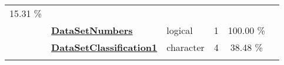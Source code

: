 \documentclass[]{article}
\begin{document}
\begin{longtable}[]{@{}lllrcl@{}}
\begin{minipage}[t]{0.10\columnwidth}
15.31 \%\strut
\end{minipage} & \begin{minipage}[t]{0.12\columnwidth}\raggedright\strut
\strut
\end{minipage}\tabularnewline
\begin{minipage}[t]{0.07\columnwidth}\raggedright\strut
\strut
\end{minipage} & \begin{minipage}[t]{0.35\columnwidth}\raggedright\strut
\textbf{\protect\hyperlink{datasetnumbers}{DataSetNumbers}}\strut
\end{minipage} & \begin{minipage}[t]{0.11\columnwidth}\raggedright\strut
logical\strut
\end{minipage} & \begin{minipage}[t]{0.10\columnwidth}\raggedleft\strut
1\strut
\end{minipage} & \begin{minipage}[t]{0.10\columnwidth}\centering\strut
100.00 \%\strut
\end{minipage} & \begin{minipage}[t]{0.12\columnwidth}\raggedright\strut
\strut
\end{minipage}\tabularnewline
\begin{minipage}[t]{0.07\columnwidth}\raggedright\strut
\strut
\end{minipage} & \begin{minipage}[t]{0.35\columnwidth}\raggedright\strut
\textbf{\protect\hyperlink{datasetclassification1}{DataSetClassification1}}\strut
\end{minipage} & \begin{minipage}[t]{0.11\columnwidth}\raggedright\strut
character\strut
\end{minipage} & \begin{minipage}[t]{0.10\columnwidth}\raggedleft\strut
4\strut
\end{minipage} & \begin{minipage}[t]{0.10\columnwidth}\centering\strut
38.48 \%\strut
\end{minipage} & \begin{minipage}[t]{0.12\columnwidth}\raggedright\strut
\strut
\end{minipage}\tabularnewline
\begin{minipage}[t]{0.07\columnwidth}\raggedright\strut
\strut
\end{minipage} & \begin{minipage}[t]{0.35\columnwidth}\raggedright\strut

\end{minipage}
\end{longtable}
\end{document}

